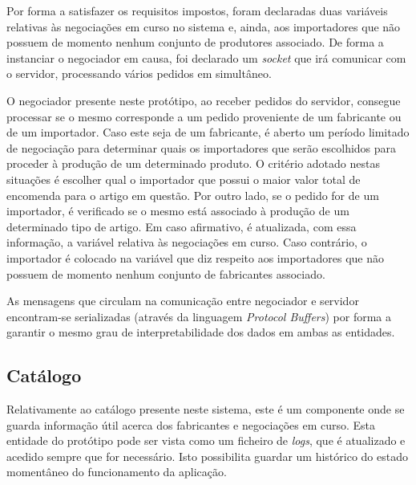 \documentclass[a4paper]{report}
\begin{document}
	Por forma a satisfazer os requisitos impostos, foram declaradas duas variáveis relativas às negociações em curso no sistema e, ainda, aos importadores que não possuem de momento nenhum conjunto de produtores associado. 
	De forma a instanciar o negociador em causa, foi declarado um \textit{socket} que irá comunicar com o servidor, processando vários pedidos em simultâneo.
	
	O negociador presente neste protótipo, ao receber pedidos do servidor, consegue processar se o mesmo corresponde a um pedido proveniente de um fabricante ou de um importador.
	Caso este seja de um fabricante, é aberto um período limitado de negociação para determinar quais os importadores que serão escolhidos para proceder à produção de um determinado produto. O critério adotado nestas situações 
	é escolher qual o importador que possui o maior valor total de encomenda para o artigo em questão.
	Por outro lado, se o pedido for de um importador, é verificado se o mesmo está associado à produção de um determinado tipo de artigo. Em caso afirmativo, é atualizada, com essa informação, a variável relativa às negociações
	em curso. Caso contrário, o importador é colocado na variável que diz respeito aos importadores que não possuem de momento nenhum conjunto de fabricantes associado. 

	As mensagens que circulam na comunicação entre negociador e servidor encontram-se serializadas (através da linguagem \textit{Protocol Buffers}) por forma a garantir o mesmo grau de interpretabilidade dos dados em ambas as entidades.

	\subsection{Catálogo}
	Relativamente ao catálogo presente neste sistema, este é um componente onde se guarda informação útil acerca dos fabricantes e negociações em curso. Esta entidade do protótipo pode ser vista como um ficheiro de \textit{logs}, que é 
	atualizado e acedido sempre que for necessário. Isto possibilita guardar um histórico do estado momentâneo do funcionamento da aplicação.
\end{document}
